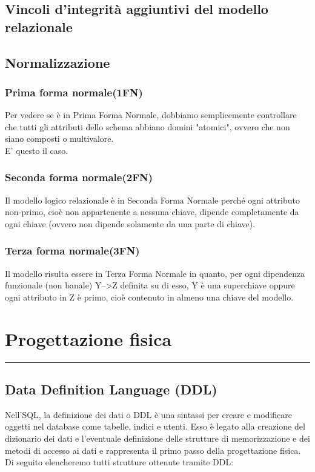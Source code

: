 \documentclass[legalpaper]{article}
\begin{document}
\subsection{Vincoli d'integrità aggiuntivi del modello relazionale}

\subsection{Normalizzazione}
\subsubsection{Prima forma normale(1FN)}
	Per vedere se è in Prima Forma Normale, dobbiamo semplicemente controllare che tutti gli attributi dello schema abbiano domini "atomici", ovvero che non siano composti o multivalore. \\
	E' questo il caso.
\subsubsection{Seconda forma normale(2FN)}
	Il modello logico relazionale è in Seconda Forma Normale perché ogni attributo non-primo, cioè non appartenente a nessuna chiave, dipende completamente da ogni chiave (ovvero non dipende solamente da una parte di chiave).
\subsubsection{Terza forma normale(3FN)}
	Il modello risulta essere in Terza Forma Normale in quanto, per ogni dipendenza funzionale (non banale) Y-->Z definita su di esso, Y è una superchiave oppure ogni attributo in Z è primo, cioè contenuto in almeno una chiave del modello.
\newpage
\section{Progettazione fisica}
\rule{\linewidth}{1.5pt}
\subsection{Data Definition Language (DDL)}
	Nell'SQL, la definizione dei dati o DDL è una sintassi per creare e modificare oggetti nel database come tabelle, indici e utenti. Esso è legato alla creazione del dizionario dei dati e l'eventuale definizione delle strutture di memorizzazione e dei metodi di accesso ai dati e rappresenta il primo passo della progettazione fisica.	\\
	Di seguito elencheremo tutti strutture ottenute tramite DDL:
	
\end{document}
